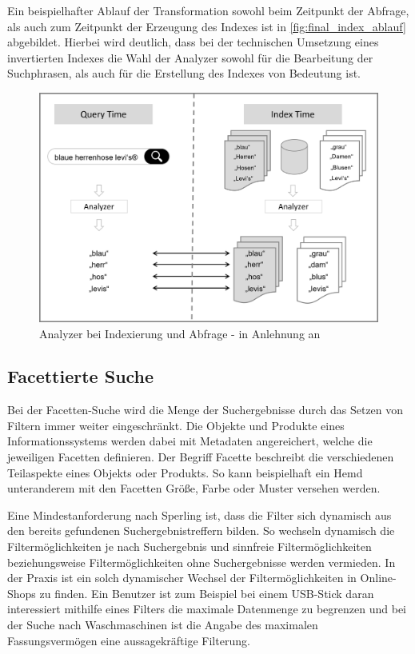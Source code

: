 Ein beispielhafter Ablauf der Transformation sowohl beim Zeitpunkt der Abfrage, als auch zum Zeitpunkt der Erzeugung des Indexes ist in \autoref{fig:final_index_ablauf} abgebildet. Hierbei wird deutlich, dass bei der technischen Umsetzung eines invertierten Indexes die Wahl der Analyzer sowohl für die Bearbeitung der Suchphrasen, als auch für die Erstellung des Indexes von Bedeutung ist.

\begin{figure}[H]
    \centering
    \includegraphics[width=0.7\linewidth]{images/Query_Index_Time.png}
    \caption{Analyzer bei Indexierung und Abfrage - in Anlehnung an \cite{SebastianRuss.2017}}
    \label{fig:final_index_ablauf}
\end{figure}

\subsection{Facettierte Suche\label{subsec2.1.3:Unterunterpunkt-3}}

Bei der Facetten-Suche wird die Menge der Suchergebnisse durch das Setzen von Filtern immer weiter eingeschränkt. Die Objekte und Produkte eines Informationssystems werden dabei mit Metadaten angereichert, welche die jeweiligen Facetten definieren. Der Begriff Facette beschreibt die verschiedenen Teilaspekte eines Objekts oder Produkts. So kann beispielhaft ein \glqq Hemd\grqq{} unteranderem mit den Facetten \glqq Größe\grqq{}, \glqq Farbe\grqq{} oder \glqq Muster\grqq{} versehen werden.

Eine Mindestanforderung nach Sperling \cite{Martin.2018} ist, dass die Filter sich dynamisch aus den bereits gefundenen Suchergebnistreffern bilden. So wechseln dynamisch die Filtermöglichkeiten je nach Suchergebnis und sinnfreie Filtermöglichkeiten beziehungsweise Filtermöglichkeiten ohne Suchergebnisse werden vermieden. In der Praxis ist ein solch dynamischer Wechsel der Filtermöglichkeiten in Online-Shops zu finden. Ein Benutzer ist zum Beispiel bei einem USB-Stick daran interessiert mithilfe eines Filters die maximale Datenmenge zu begrenzen und bei der Suche nach Waschmaschinen ist die Angabe des maximalen Fassungsvermögen eine aussagekräftige Filterung.

